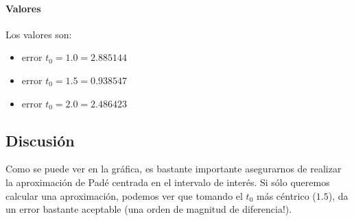 \paragraph{Valores}

Los valores son:

\begin{itemize}
	\item error $t_0 = 1.0 = 2.885144$
	\item error $t_0 = 1.5 = 0.938547$
	\item error $t_0 = 2.0 = 2.486423$
\end{itemize}

\subsection{Discusión}

Como se puede ver en la gráfica, es bastante importante asegurarnos de realizar la aproximación de Padé centrada en el intervalo de interés. Si sólo queremos calcular una aproximación, podemos ver que tomando el $t_0$ más céntrico ($1.5$), da un error bastante aceptable (una orden de magnitud de diferencia!).